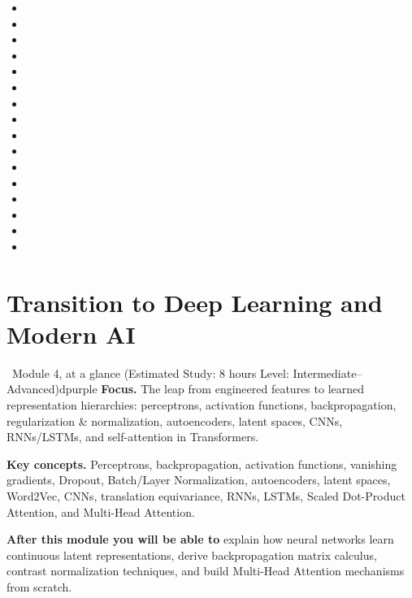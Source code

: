 \documentclass[11pt,a4paper]{article}
\begin{document}
	\begin{sourcesbox}
		\small
		\begin{itemize}[nosep]
			\item {}
			\item {}
			\item {}
			\item {}
			\item {}
			\item {}
			\item {}
			\item {}
			\item {}
			\item {}
			\item {}
			\item {}
			\item {}
			\item {}
			\item {}
			\item {}
		\end{itemize}
	\end{sourcesbox}
	
	\clearpage
	\section{Transition to Deep Learning and Modern AI}
	
	\begin{modulecard}{\faBrain\ Module 4, at a glance \hfill \small\normalfont (Estimated Study: 8 hours \textbullet{} Level: Intermediate--Advanced)}{dpurple}
		\textbf{Focus.} The leap from engineered features to learned representation hierarchies: perceptrons, activation functions, backpropagation, regularization \& normalization, autoencoders, latent spaces, CNNs, RNNs/LSTMs, and self-attention in Transformers.
		
		\medskip
		\textbf{Key concepts.} Perceptrons, backpropagation, activation functions, vanishing gradients, Dropout, Batch/Layer Normalization, autoencoders, latent spaces, Word2Vec, CNNs, translation equivariance, RNNs, LSTMs, Scaled Dot-Product Attention, and Multi-Head Attention.
		
		\medskip
		\textbf{After this module you will be able to} explain how neural networks learn continuous latent representations, derive backpropagation matrix calculus, contrast normalization techniques, and build Multi-Head Attention mechanisms from scratch.
	\end{modulecard}
	
\end{document}
